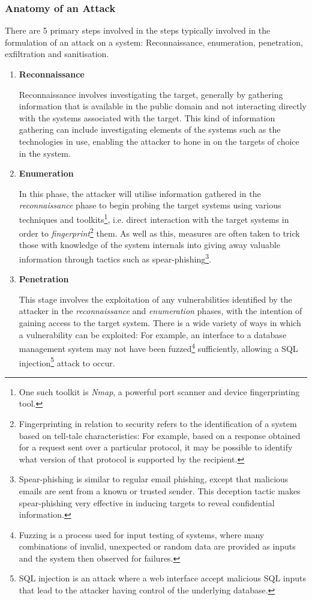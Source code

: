  \subsubsection{Anatomy of an Attack}

There are 5 primary steps involved in the steps typically involved in the formulation of an attack on a system: Reconnaissance, enumeration, penetration, exfiltration and sanitisation. \cite{CiscoAnatomyOfACyberAttack}

\begin{enumerate}
\item \textbf{Reconnaissance}

Reconnaissance involves investigating the target, generally by gathering information that is available in the public domain and not interacting directly with the systems associated with the target. This kind of information gathering can include investigating elements of the systems such as the technologies in use, enabling the attacker to hone in on the targets of choice in the system.


\item \textbf{Enumeration}

In this phase, the attacker will utilise information gathered in the \textit{reconnaissance} phase to begin probing the target systems using various techniques and toolkits\footnote{One such toolkit is \textit{Nmap}, a powerful port scanner and device fingerprinting tool.}, i.e. direct interaction with the target systems in order to \textit{fingerprint}\footnote{Fingerprinting in relation to security refers to the identification of a system based on tell-tale characteristics: For example, based on a response obtained for a request sent over a particular protocol, it may be possible to identify what version of that protocol is supported by the recipient.} them. As well as this, measures are often taken to trick those with knowledge of the system internals into giving away valuable information through tactics such as spear-phishing\footnote{Spear-phishing is similar to regular email phishing, except that malicious emails are sent from a known or trusted sender. This deception tactic makes spear-phishing very effective in inducing targets to reveal confidential information.}.
\item \textbf{Penetration} 

This stage involves the exploitation of any vulnerabilities identified by the attacker in the \textit{reconnaissance} and \textit{enumeration} phases, with the intention of gaining access to the target system. There is a wide variety of ways in which a vulnerability can be exploited: For example, an interface to a database management system may not have been fuzzed\footnote{Fuzzing is a process used for input testing of systems, where many combinations of invalid, unexpected or random data are provided as inputs and the system then observed for failures.} sufficiently, allowing a SQL injection\footnote{SQL injection is an attack where a web interface accept malicious SQL inputs that lead to the attacker having control of the underlying database.} attack to occur.


\end{enumerate}
